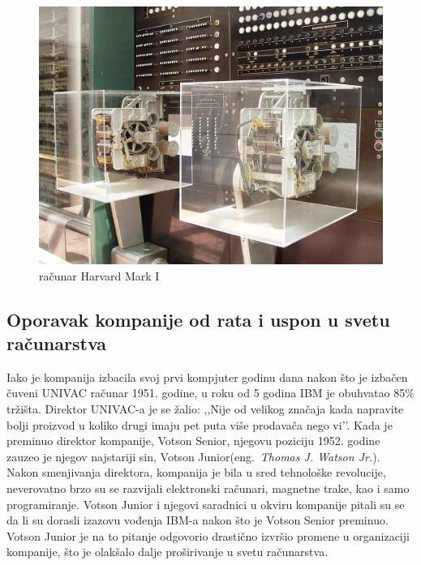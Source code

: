 \documentclass[a4paper]{article}
\begin{document}
\begin{figure}
\begin{center}
\includegraphics[scale=0.75]{HarvardMarkI.jpg}
\end{center}
\caption{računar Harvard Mark I}
\label{fig:HM1}
\end{figure}

\subsection{Oporavak kompanije od rata i uspon u svetu računarstva}%
Iako je kompanija izbacila svoj prvi kompjuter godinu dana nakon što je izbačen čuveni UNIVAC\cite{univac} računar 1951. godine, u roku od 5 godina IBM je obuhvatao 85\% tržišta. Direktor UNIVAC-a je se žalio: ,,Nije od velikog značaja kada napravite bolji proizvod u koliko drugi imaju pet puta više prodavača nego vi’’. Kada je preminuo direktor kompanije, Votson Senior, njegovu poziciju 1952. godine zauzeo je njegov najstariji sin, Votson Junior(eng.~{\em Thomas J. Watson Jr.}). Nakon smenjivanja direktora, kompanija je bila u sred tehnološke revolucije, neverovatno brzo su se razvijali elektronski računari, magnetne trake, kao i samo programiranje. Votson Junior i njegovi saradnici u okviru kompanije pitali su se da li su dorasli izazovu vođenja IBM-a nakon što je Votson Senior preminuo. Votson Junior je na to pitanje odgovorio drastično izvršio promene u organizaciji kompanije, što je olakšalo dalje proširivanje u svetu računarstva.
\end{document}
